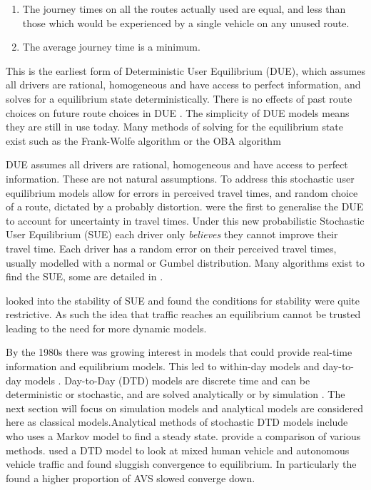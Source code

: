 \documentclass[12pt, a4paper, onecolumn]{article}
\begin{document}
\begin{enumerate}
	\item The journey times on all the routes actually used are equal, and
	less than those which would be experienced by a single vehicle
	on any unused route.
	\item The average journey time is a minimum.
	\end{enumerate}

This is the earliest form of Deterministic User Equilibrium (DUE), which assumes all drivers are rational, homogeneous and have access to perfect information, and solves for a equilibrium state deterministically. There is no effects of past route choices on future route choices in DUE \citep{Zhang2011}. The simplicity of DUE models means they are still in use today. Many methods of solving for the equilibrium state exist such as the Frank-Wolfe algorithm \citep{Frank1956} or the OBA algorithm %

DUE assumes all drivers are  rational, homogeneous and have access to perfect information. These are not natural assumptions. To address this stochastic user equilibrium models allow for errors in perceived travel times, and random choice of a route, dictated by a probably distortion. 
\cite{Daganzo1977} were the first to generalise the DUE to account for uncertainty in travel times. Under this new probabilistic Stochastic User Equilibrium (SUE) each driver only \textit{believes} they cannot improve their travel time. Each driver has a random error on their perceived travel times, usually modelled with a normal or Gumbel distribution. Many algorithms exist to find the SUE, some are detailed in \cite{Prashker2004}. 

\cite{Horowitz1984} looked into the stability of SUE and found the conditions for stability were quite restrictive. As such the idea that traffic reaches an equilibrium cannot be trusted leading to the need for more dynamic models.

By the 1980s there was growing interest in models that could provide real-time information and equilibrium models. This led to within-day models and day-to-day models \cite{Watling2003}. Day-to-Day (DTD) models are discrete time and can be deterministic or stochastic, and are solved analytically or by simulation \citep{Peeta2003}. The next section will focus on simulation models and analytical models are considered here as classical models.Analytical methods of stochastic DTD models include \cite{Cascetta1989} who uses a Markov model to find a steady state. \cite{Hazelton2016} provide a comparison of various methods. \cite{Li2018} used a DTD model to look at mixed human vehicle and autonomous vehicle traffic and found sluggish convergence to equilibrium. In particularly the found a higher proportion of AVS slowed converge down. 
 
\end{document}
